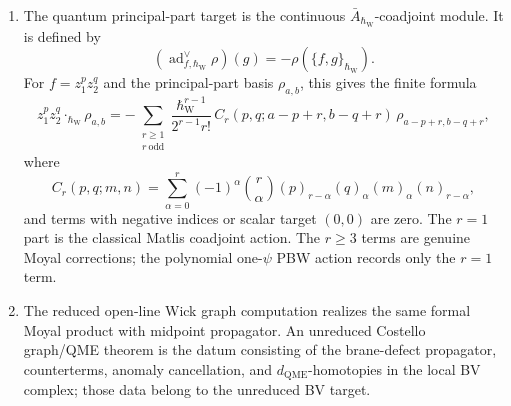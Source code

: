 \begin{prop}
\begin{enumerate}
      equivalent intermediate forms after choosing a classical lift.
    \item The quantum principal-part target is the continuous
      \(\bar A_{\hbar_{\mathrm{W}}}\)-coadjoint module.  It is defined by
      \[
        (\operatorname{ad}^{\vee}_{f,\hbar_{\mathrm{W}}}\rho)(g)
        =
        -\rho(\{f,g\}_{\hbar_{\mathrm{W}}}).
      \]
      For \(f=z_1^pz_2^q\) and the principal-part basis
      \(\rho_{a,b}\), this gives the finite formula
      \[
        z_1^pz_2^q\cdot_{\hbar_{\mathrm{W}}}\rho_{a,b}
        =
        -\sum_{\substack{r\geq1\\ r\ \mathrm{odd}}}
        \frac{\hbar_{\mathrm{W}}^{r-1}}{2^{r-1}r!}\,
        C_r(p,q;a-p+r,b-q+r)\,
        \rho_{a-p+r,b-q+r},
      \]
      where
      \[
        C_r(p,q;m,n)=
        \sum_{\alpha=0}^{r}(-1)^\alpha\binom r\alpha
        (p)_{r-\alpha}(q)_\alpha(m)_\alpha(n)_{r-\alpha},
      \]
      and terms with negative indices or scalar target \((0,0)\) are
      zero.  The \(r=1\) part is the classical Matlis coadjoint action.
      The \(r\ge3\) terms are genuine Moyal corrections; the polynomial
      one-\(\psi\) PBW action records only the \(r=1\) term.
    \item The reduced open-line Wick graph computation realizes the same
      formal Moyal product with midpoint propagator.  An unreduced
      Costello graph/QME theorem is the datum consisting of the brane-defect
      propagator, counterterms, anomaly cancellation, and
      \(d_{\mathrm{QME}}\)-homotopies in the local BV complex; those data
      belong to the unreduced BV target.
  \end{enumerate}
\end{prop}

